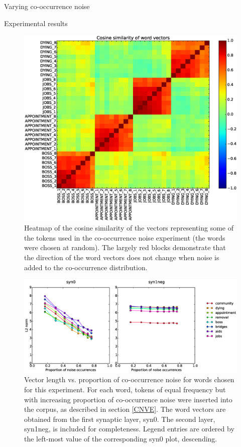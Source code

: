 \documentclass{article} %
\begin{document}
\begin{section}{Varying co-occurrence noise}
\begin{subsection}{Experimental results}
\begin{figure}
	\includegraphics[scale=0.5]{cooccurrence-noise-heatmap}
	\caption{ Heatmap of the cosine similarity of the vectors
          representing some of the tokens used in the co-occurrence
          noise experiment (the words were chosen at random).  The
          largely red blocks demonstrate that the direction of the word
          vectors does not change when noise is added to the
          co-occurrence distribution.  }
	\label{fig:co-occurrence-noise-heatmap}
\end{figure}

\begin{figure}
	\includegraphics[scale=0.6]{cooccurrence-noise-graph}
	\caption{ Vector length vs. proportion of co-occurrence noise
          for words chosen for this experiment.  For each word, tokens
          of equal frequency but with increasing proportion of
          co-occurrence noise were inserted into the corpus, as
          described in section \ref{CNVE}.  The word vectors are
          obtained from the first synaptic layer, syn0.  The second
          layer, syn1neg, is included for completeness.  
	  Legend entries are ordered by the left-most value of the corresponding syn0 plot, descending.}
	\label{fig:co-occurrence-noise-graph}
\end{figure}

\end{subsection}

\end{section}
\end{document}
